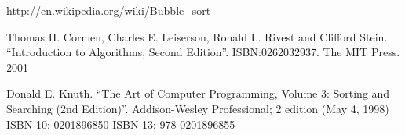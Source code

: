 \documentclass{article}
\begin{document}
\begin{thebibliography}{99}

http://en.wikipedia.org/wiki/Bubble\_sort

Thomas H. Cormen, Charles E. Leiserson, Ronald L. Rivest and Clifford Stein.
``Introduction to Algorithms, Second Edition''. ISBN:0262032937. The MIT Press. 2001

Donald E. Knuth. ``The Art of Computer Programming, Volume 3: Sorting and Searching (2nd Edition)''. Addison-Wesley Professional; 2 edition (May 4, 1998) ISBN-10: 0201896850 ISBN-13: 978-0201896855

\end{thebibliography}

\ifx\wholebook\relax\else
\end{document}
